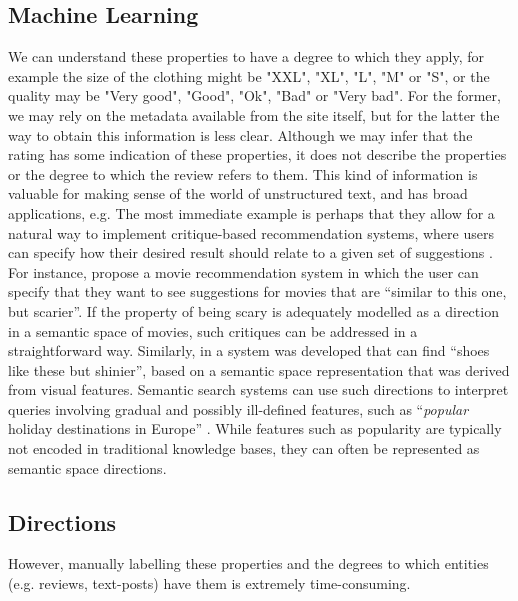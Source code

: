 \subsection{Machine Learning}


We can understand these properties to have a degree to which they apply, for example the size of the clothing might be "XXL", "XL", "L", "M" or "S", or the quality may be "Very good", "Good", "Ok", "Bad" or "Very bad". For the former, we may rely on the metadata available from the site itself, but for the latter the way to obtain this information is less clear. Although we may infer that the rating has some indication of these properties, it does not describe the properties or the degree to which the review refers to them. This kind of information is valuable for making sense of the world of unstructured text, and has broad applications, e.g. The most immediate example is perhaps that they allow for a natural way to implement critique-based recommendation systems, where users can specify how their desired result should relate to a given set of suggestions \cite{viappiani2006preference}. For instance, \cite{Vig:2012:TGE:2362394.2362395} propose a movie recommendation system in which the user can specify that they want to see suggestions for movies that are ``similar to this one, but scarier''. If the property of being scary is adequately modelled as a direction in a semantic space of movies, such critiques can be addressed in a straightforward way. Similarly, in \cite{kovashka2012whittlesearch} a system was developed that can find ``shoes like these but shinier'', based on a semantic space representation that was derived from visual features. Semantic search systems can use such directions to interpret queries involving gradual and possibly ill-defined features, such as ``\emph{popular} holiday destinations in Europe'' \cite{DBLP:conf/sigir/JameelBS17}. While features such as popularity are typically not encoded in traditional knowledge bases, they can often be represented as semantic space directions.  %

\subsection{Directions}\label{intro:directions}


However, manually labelling these properties and the degrees to which entities (e.g. reviews, text-posts) have them is extremely time-consuming. 

